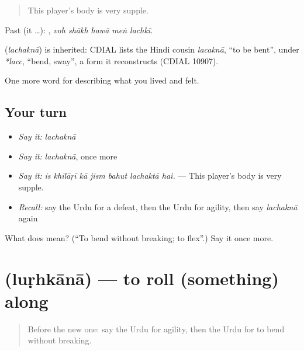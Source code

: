 \begin{quote}
This player's body is very supple.
\end{quote}

Past (it …):     , \emph{voh shākh hawā meṅ lachkī}.

\begin{cousinweb}
\textbf{} (\emph{lachaknā}) is inherited: CDIAL lists the Hindi cousin \emph{lacaknā}, \textquotedblleft{}to be bent\textquotedblright{}, under \emph{*lacc}, \textquotedblleft{}bend, sway\textquotedblright{}, a form it reconstructs (CDIAL 10907).
\end{cousinweb}

\begin{grammarlens}[title={What you've built}]
One more word for describing what you lived and felt.
\end{grammarlens}

\subsection*{Your turn}
\begin{itemize}
\raggedright
  \item \emph{Say it:} \emph{lachaknā}
  \item \emph{Say it:} \emph{lachaknā}, once more
  \item \emph{Say it:} \emph{is khilāṛī kā jism bahut lachaktā hai.} — This player's body is very supple.
  \item \emph{Recall:} say the Urdu for a defeat, then the Urdu for agility, then say \emph{lachaknā} again
\end{itemize}

\begin{tcolorbox}[breakable,colback=teal!4,colframe=teal!35!black,title={Before you move on}]
What does  mean? (\textquotedblleft{}To bend without breaking; to flex\textquotedblright{}.) Say it once more.
\end{tcolorbox}
\section[\texorpdfstring{\ur{لڑھکانا} (luṛhkānā)}{لڑھکانا (luṛhkānā)}]{ (luṛhkānā) — to roll (something) along}

\label{lesson:UR-C522-lurhkana}



\begin{quote}
Before the new one: say the Urdu for agility, then the Urdu for to bend without breaking.
\end{quote}

